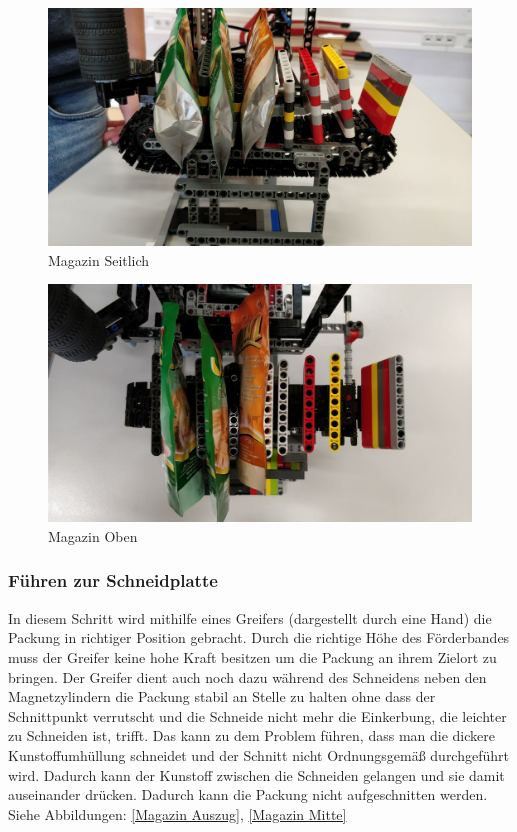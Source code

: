 \begin{figure}[H]
\begin{center}
\includegraphics[width=13cm]{Bilder/Ablauf_1_png/Magazin_Seitlich.png}
\caption{Magazin Seitlich}
\label{Magazin Seitlich}
\end{center}
\end{figure}

\begin{figure}[H]
\begin{center}
\includegraphics[width=13cm]{Bilder/Ablauf_1_png/Magazin_Oben.jpeg}
\caption{Magazin Oben}
\label{Magazin Oben}
\end{center}
\end{figure}

\subsubsection{Führen zur Schneidplatte}

In diesem Schritt wird mithilfe eines Greifers (dargestellt durch eine Hand) die Packung in richtiger Position gebracht.
Durch die richtige Höhe des Förderbandes muss der Greifer keine hohe Kraft besitzen um die Packung an ihrem Zielort zu bringen. Der Greifer dient auch noch dazu während des Schneidens neben den Magnetzylindern die Packung stabil an Stelle zu halten ohne dass der Schnittpunkt verrutscht und die Schneide nicht mehr die Einkerbung, die leichter zu Schneiden ist, trifft. Das kann zu dem Problem führen, dass man die dickere Kunstoffumhüllung schneidet und der Schnitt nicht Ordnungsgemäß durchgeführt wird. Dadurch kann der Kunstoff zwischen die Schneiden gelangen und sie damit auseinander drücken. Dadurch kann die Packung nicht aufgeschnitten werden. Siehe Abbildungen: \ref{Magazin Auszug}, \ref{Magazin Mitte}

